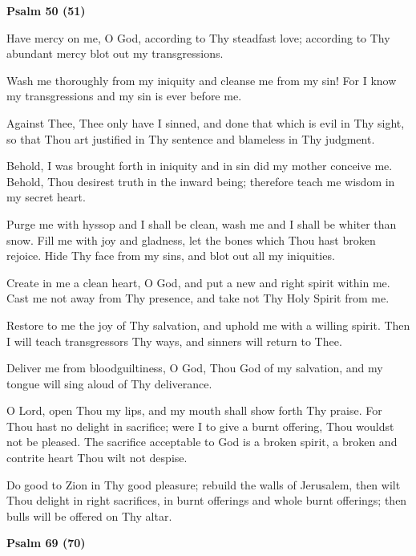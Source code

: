\documentclass[paper=a6,fontsize=2.3mm]{scrartcl}
\begin{document}
\newpage
\begin{center}
\textbf{Psalm 50 (51)}
\end{center}

\noindent{}
\begin{minipage}[t]{\dimexpr \textwidth-10mm}
Have mercy on me, O God, according to Thy steadfast love; according to Thy abundant mercy blot out my transgressions.

Wash me thoroughly from my iniquity and cleanse me from my sin!  For I know my transgressions and my sin is ever before me.

Against Thee, Thee only have I sinned, and done that which is evil in Thy sight, so that Thou art justified in Thy sentence and blameless in Thy judgment.

Behold, I was brought forth in iniquity and in sin did my mother conceive me.  Behold, Thou desirest truth in the inward being; therefore teach me wisdom in my secret heart.

Purge me with hyssop and I shall be clean, wash me and I shall be whiter than snow.  Fill me with joy and gladness, let the bones which Thou hast broken rejoice.  Hide Thy face from my sins, and blot out all my iniquities.

Create in me a clean heart, O God, and put a new and right spirit within me.  Cast me not away from Thy presence, and take not Thy Holy Spirit from me.

Restore to me the joy of Thy salvation, and uphold me with a willing spirit.  Then I will teach transgressors Thy ways, and sinners will return to Thee.

Deliver me from bloodguiltiness, O God, Thou God of my salvation, and my tongue will sing aloud of Thy deliverance.

O Lord, open Thou my lips, and my mouth shall show forth Thy praise.  For Thou hast no delight in sacrifice; were I to give a burnt offering, Thou wouldst not be pleased.  The sacrifice acceptable to God is a broken spirit, a broken and contrite heart Thou wilt not despise.

Do good to Zion in Thy good pleasure; rebuild the walls of Jerusalem, then wilt Thou delight in right sacrifices, in burnt offerings and whole burnt offerings; then bulls will be offered on Thy altar.
\end{minipage}

\newpage
\begin{center}
\textbf{Psalm 69 (70)}
\end{center}
\end{document}
